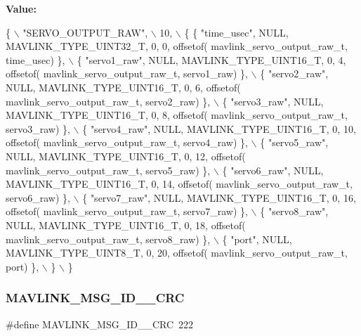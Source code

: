 {\bfseries Value\+:}
\begin{DoxyCode}
\{ \(\backslash\)
    \textcolor{stringliteral}{"SERVO\_OUTPUT\_RAW"}, \(\backslash\)
    10, \(\backslash\)
    \{  \{ \textcolor{stringliteral}{"time\_usec"}, NULL, MAVLINK_TYPE_UINT32_T, 0, 0, offsetof(
      mavlink_servo_output_raw_t, time\_usec) \}, \(\backslash\)
         \{ \textcolor{stringliteral}{"servo1\_raw"}, NULL, MAVLINK_TYPE_UINT16_T, 0, 4, offsetof(
      mavlink_servo_output_raw_t, servo1\_raw) \}, \(\backslash\)
         \{ \textcolor{stringliteral}{"servo2\_raw"}, NULL, MAVLINK_TYPE_UINT16_T, 0, 6, offsetof(
      mavlink_servo_output_raw_t, servo2\_raw) \}, \(\backslash\)
         \{ \textcolor{stringliteral}{"servo3\_raw"}, NULL, MAVLINK_TYPE_UINT16_T, 0, 8, offsetof(
      mavlink_servo_output_raw_t, servo3\_raw) \}, \(\backslash\)
         \{ \textcolor{stringliteral}{"servo4\_raw"}, NULL, MAVLINK_TYPE_UINT16_T, 0, 10, offsetof(
      mavlink_servo_output_raw_t, servo4\_raw) \}, \(\backslash\)
         \{ \textcolor{stringliteral}{"servo5\_raw"}, NULL, MAVLINK_TYPE_UINT16_T, 0, 12, offsetof(
      mavlink_servo_output_raw_t, servo5\_raw) \}, \(\backslash\)
         \{ \textcolor{stringliteral}{"servo6\_raw"}, NULL, MAVLINK_TYPE_UINT16_T, 0, 14, offsetof(
      mavlink_servo_output_raw_t, servo6\_raw) \}, \(\backslash\)
         \{ \textcolor{stringliteral}{"servo7\_raw"}, NULL, MAVLINK_TYPE_UINT16_T, 0, 16, offsetof(
      mavlink_servo_output_raw_t, servo7\_raw) \}, \(\backslash\)
         \{ \textcolor{stringliteral}{"servo8\_raw"}, NULL, MAVLINK_TYPE_UINT16_T, 0, 18, offsetof(
      mavlink_servo_output_raw_t, servo8\_raw) \}, \(\backslash\)
         \{ \textcolor{stringliteral}{"port"}, NULL, MAVLINK_TYPE_UINT8_T, 0, 20, offsetof(
      mavlink_servo_output_raw_t, port) \}, \(\backslash\)
         \} \(\backslash\)
\}
\end{DoxyCode}
\mbox{\label{mavlink__msg__servo__output__raw_8h_ab787f5473a7ccf1fd2c59bd5e04f074c}} 
\subsubsection{M\+A\+V\+L\+I\+N\+K\+\_\+\+M\+S\+G\+\_\+\+I\+D\+\_\+\_\+\+C\+RC}
{\footnotesize\ttfamily \#define M\+A\+V\+L\+I\+N\+K\+\_\+\+M\+S\+G\+\_\+\+I\+D\+\_\+\_\+\+C\+RC~222}

